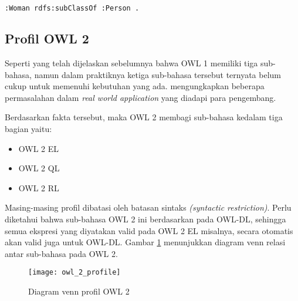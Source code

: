 \begin{lstlisting}[language=XML, caption=contoh sintak turtle, xleftmargin=0pt]
	:Woman rdfs:subClassOf :Person .
\end{lstlisting}

\subsection{Profil OWL 2}
Seperti yang telah dijelaskan sebelumnya bahwa OWL 1 memiliki tiga sub-bahasa, namun dalam praktiknya ketiga sub-bahasa tersebut ternyata belum cukup untuk memenuhi kebutuhan yang ada. \citet{patel} mengungkapkan beberapa permasalahan dalam \emph{real world application} yang diadapi para pengembang.

Berdasarkan fakta tersebut, maka OWL 2 membagi sub-bahasa kedalam tiga bagian yaitu:
\begin{itemize}
	\item OWL 2 EL
	\item OWL 2 QL
	\item OWL 2 RL
\end{itemize}

Masing-masing profil dibatasi oleh batasan sintaks \emph{(syntactic restriction)}. Perlu diketahui bahwa sub-bahasa OWL 2 ini berdasarkan pada OWL-DL, sehingga semua ekspresi yang diyatakan valid pada OWL 2 EL misalnya, secara otomatis akan valid juga untuk OWL-DL. Gambar \ref{fig:owl_2_profile} menunjukkan diagram venn relasi antar sub-bahasa pada OWL 2.

\begin{figure}[ht]
	\centering
	\texttt{[image: owl\_2\_profile]}
	\caption{Diagram venn profil OWL 2}
	\label{fig:owl_2_profile}
\end{figure}